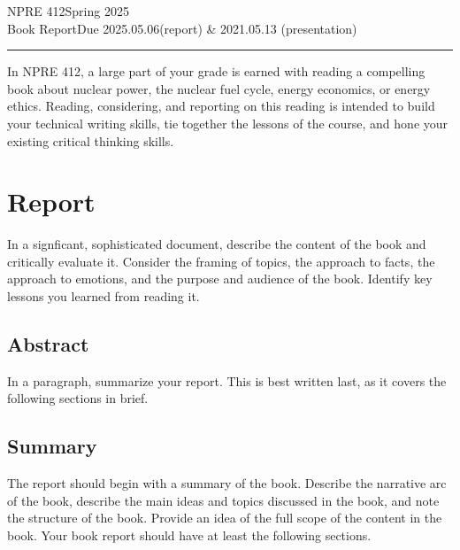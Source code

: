 \documentclass{article}
\newcommand{\class}{NPRE 412}
\newcommand{\term}{Spring 2025}
\newcommand{\assignment}{Book Report}
\newcommand{\duedate}{2025.05.06}
\begin{document}
 


\class \hfill \term \\
\assignment \hfill Due \duedate (report) \& 2021.05.13 (presentation)\\
\rule[1ex]{\textwidth}{.1pt}


In NPRE 412, a large part of your grade is earned with reading a compelling 
book about nuclear power, the nuclear fuel cycle, energy economics, or energy 
ethics. Reading, considering, and reporting on this reading is intended to 
build your technical writing skills, tie together the lessons of the course, 
and hone your existing critical thinking skills.

\section{Report}
In a signficant, sophisticated document, describe the content of the book and 
critically evaluate it. Consider the framing of topics, the approach to facts, 
the approach to emotions, and the purpose and audience of the book. Identify 
key lessons you learned from reading it.

\subsection{Abstract}
In a paragraph, summarize your report. This is best written last, as it covers the following sections in brief.

\subsection{Summary}
The report should begin with a summary of the book. Describe the narrative arc 
of the book, describe the main ideas and topics discussed in the book, and note 
the structure of the book. Provide an idea of the full scope of the content in 
the book. Your book report should have at least the following sections.
\end{document}
